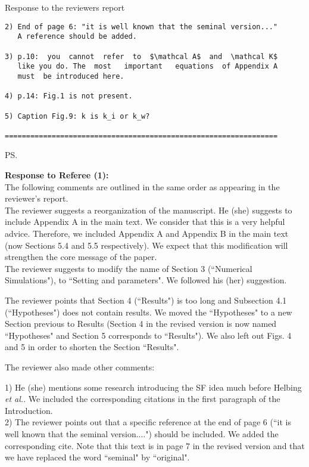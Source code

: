 \documentclass[a4paper,12pt]{letter}
\begin{document}
\begin{letter}{Response to the reviewers report}
\begin{verbatim}
2) End of page 6: "it is well known that the seminal version..."
   A reference should be added.

3) p.10:  you  cannot  refer  to  $\mathcal A$  and  \mathcal K$ 
   like you do. The  most   important   equations  of Appendix A 
   must  be introduced here.

4) p.14: Fig.1 is not present.

5) Caption Fig.9: k is k_i or k_w?

================================================================
\end{verbatim}


\ps{\textbf{Response to Referee (1):}
\\ 

The following comments are outlined in the same order as appearing in the
reviewer’s report. \\

The reviewer suggests a reorganization of the manuscript. He (she) suggests to include Appendix A in the main text.
We consider that this is a very helpful advice. Therefore, we included Appendix A and Appendix B in the main text (now Sections 5.4 and 5.5 respectively). 
We expect that this modification will strengthen the core message of the paper. \\ 

The reviewer suggests to modify the name of Section 3 (``Numerical Simulations"), to ``Setting and parameters". We followed his (her) suggestion. 

The reviewer points that Section 4 (``Results") is too long and Subsection 4.1 (``Hypotheses")
does not contain results.  We moved the ``Hypotheses" to a new Section previous to Results 
(Section 4 in the revised version is now named ``Hypotheses" and Section 5 corresponds to ``Results"). We also left out Figs. 4 and 5 in order to shorten the Section ``Results". 

The reviewer also made other comments:

1) He (she) mentions some research introducing the SF idea much before 
Helbing \textit{et al.}. We included the corresponding citations 
in the first paragraph of the Introduction. \\


2) The reviewer points out that a specific reference at the end of 
page 6 (``it is well known that the seminal version....") should be included. 
We added the corresponding cite. Note that this text is in page 7 in the revised version and that we have replaced the word ``seminal" by ``original".   \\

}
\end{letter}
\end{document}
